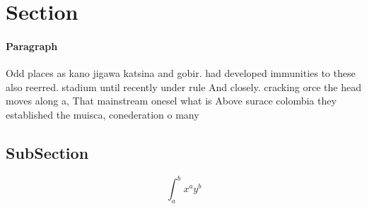\documentclass[a4paper]{article}
\begin{document}
\section{Section}

\paragraph{Paragraph}
Odd places as kano jigawa katsina and gobir. had developed immunities to these also reerred. stadium until recently under rule And closely. cracking orce the head moves along a, That mainstream onesel what is Above surace colombia they established the muisca, conederation o many


\subsection{SubSection}

\[ \int_{a}^{b}{x^{a}y^{b}} \]
\end{document}
